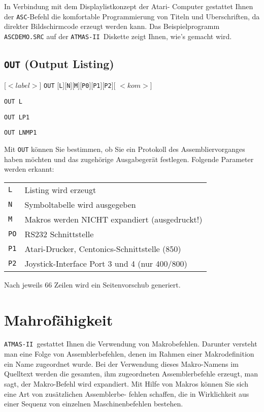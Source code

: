 \documentclass[10pt,a4paper,twoside,final,openright,titlepage]{memoir}
\newcommand{\foo}[1]{\ensuremath{< \!\! #1 \!\! >}}
\def\atmas{\texttt{AT\-MAS-II }}
\begin{document}
In Verbindung mit dem Displaylistkonzept der Atari-
Computer gestattet Ihnen der \texttt{ASC}-Befehl die komfortable Programmierung von Titeln und Uberschriften, da
direkter Bildschirmcode erzeugt werden kann. Das Beispielprogramm \texttt{ASCDEMO.SRC} auf der \atmas Diskette
zeigt Ihnen, wie's gemacht wird.

\subsection{\texttt{OUT} (Output Listing)}

		  {[\foo{label}] \texttt{OUT} [\texttt{L}][\texttt{N}][\texttt{M}][\texttt{P0}][\texttt{P1}][\texttt{P2}][ \foo{kom}]}
		  {
\texttt{OUT L} \par
\texttt{OUT LP1} \par
\texttt{OUT LNMP1} \par
}

Mit \texttt{OUT} können Sie bestimmen, ob Sie ein Protokoll des
Assembliervorganges haben möchten und das zugehörige
Ausgabegerät festlegen. Folgende Parameter werden
erkannt:
\bigskip

\renewcommand{\arraystretch}{1.2}
\begin{tabular}{lp{25em}}
\texttt{L}	& Listing wird erzeugt \\
\texttt{N}	& Symboltabelle wird ausgegeben \\
\texttt{M}	& Makros werden NICHT expandiert (ausgedruckt!) \\
\texttt{PO}	& RS232 Schnittstelle \\
\texttt{P1}	& Atari-Drucker, Centonics-Schnittstelle (850) \\
\texttt{P2}	& Joystick-Interface Port 3 und 4 (nur 400/800)
\end{tabular}
\renewcommand{\arraystretch}{1.8}
\bigskip

Nach jeweils 66 Zeilen wird ein Seitenvorschub
generiert.

\section{Mahrofähigkeit}

\atmas gestattet Ihnen die Verwendung von Makrobefehlen. Darunter versteht man eine Folge von
Assemblerbefehlen, denen im Rahmen einer Makrodefinition ein Name zugeordnet wurde. Bei der Verwendung
dieses Makro-Namens im Quelltext werden die gesamten,
ihm zugeordneten Assemblerbefehle erzeugt, man sagt,
der Makro-Befehl wird expandiert. Mit Hilfe von Makros
können Sie sich eine Art von zusätzlichen Assemblerbe-
fehlen schaffen, die in Wirklichkeit aus einer Sequenz
von einzelnen Maschinenbefehlen bestehen.
\end{document}
